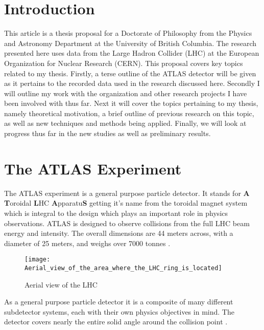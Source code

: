 \documentclass[12pt]{article}
\begin{document}

\newpage
\section{Introduction}
This article is a thesis proposal for a Doctorate of Philosophy from the Physics
and Astronomy Department at the University of British Columbia. The research
presented here uses data from the Large Hadron Collider (LHC) at the European
Organization for Nuclear Research (CERN). This proposal covers key topics
related to my thesis. Firstly, a terse outline of the ATLAS detector will be
given as it pertains to the recorded data used in the research discussed here.
Secondly I will outline my work with the organization and other research
projects I have been involved with thus far. Next it will cover the topics
pertaining to my thesis, namely theoretical motivation, a brief outline of
previous research on this topic, as well as new techniques and methods being
applied. Finally, we will look at progress thus far in the new studies as well
as preliminary results.

\section{The ATLAS Experiment}
The ATLAS experiment is a general purpose particle detector. It stands for
\textbf{A} \textbf{T}oroidal \textbf{L}HC \textbf{A}pparatu\textbf{S} getting
it's name from the toroidal magnet system which is integral to the design which
plays an important role in physics observations. ATLAS is designed to observe
collisions from the full LHC beam energy and intensity. The overall dimensions
are 44 meters across, with a diameter of 25 meters, and weighs over 7000 tonnes
\cite{Aad_2024}. \begin{wrapfigure}{l}{0.42\textwidth}
    \centering
    \texttt{[image: Aerial\_view\_of\_the\_area\_where\_the\_LHC\_ring\_is\_located]}
    \caption{Aerial view of the LHC}
    \label{fig:aerial_view}
\end{wrapfigure} As a general purpose particle detector it is a composite of
many different subdetector systems, each with their own physics objectives in
mind. The detector covers nearly the entire solid angle around the
collision point \cite{The_ATLAS_Collaboration_2008}. 
\end{document}
